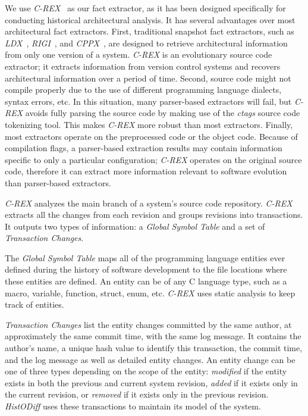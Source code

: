 \documentclass[times, 10pt,twocolumn]{article}
\newcommand{\crex}{\emph{C-REX}\xspace}
\begin{document}
We use \emph{C-REX}~\cite{crex} as our fact extractor, as it has been
designed specifically for conducting historical architectural
analysis.  It has several advantages over most architectural fact
extractors.  First, traditional snapshot fact extractors, such as
\emph{LDX}~\cite{ldx}, \emph{RIGI}~\cite{rigi}, and
\emph{CPPX}~\cite{cppx}, are designed to retrieve architectural
information from only one version of a system.  \emph{C-REX} is an
evolutionary source code extractor; it extracts information from
version control systems and recovers architectural information over a
period of time.  Second, source code might not compile properly due to
the use of different programming language dialects, syntax errors,
etc.  In this situation, many parser-based extractors will fail, but
\emph{C-REX} avoids fully parsing the source code by making use of the
\emph{ctags} source code tokenizing tool.%
This makes
\emph{C-REX} more robust than most extractors.  Finally, most
extractors operate on the preprocessed code or the object code.
Because of compilation flags, a parser-based extraction results may
contain information specific to only a particular configuration;
\emph{C-REX} operates on the original source code, therefore it can
extract more information relevant to software evolution than
parser-based extractors.

\emph{C-REX} analyzes the main branch of a system's source code
repository.  \crex extracts all the changes from each revision and
groups revisions into transactions.  It outputs two types of
information: a \emph{Global Symbol Table} and a set of
\emph{Transaction Changes}\cite{zimmermann-msr-2004}.

The \emph{Global Symbol Table} maps all of the programming language
entities ever defined during the history of software development to
the file locations where these entities are defined.  An entity can be
of any C language type, such as a macro, variable, function, struct,
enum, etc.  \crex uses static analysis to keep track of entities.



\emph{Transaction Changes} list the entity changes committed by the
same author, at approximately the same commit time, with the same log
message.  It contains the author's name, a unique hash value to
identify this transaction, the commit time, and the log message as
well as detailed entity changes.  An entity change can be one of three
types depending on the scope of the entity: \emph{modified} if the
entity exists in both the previous and current system revision,
\emph{added} if it exists only in the current revision, or
\emph{removed} if it exists only in the previous revision.
\emph{HistODiff} uses these transactions to maintain its model of the
system.
\end{document}
